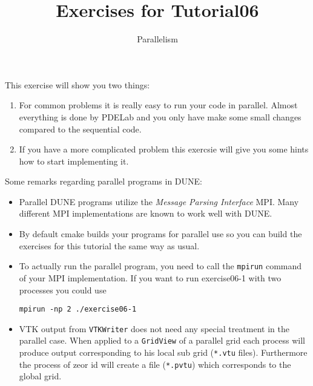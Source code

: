 \documentclass[12pt,a4paper]{article}
\title{\textbf{Exercises for Tutorial06}}
\subtitle{Parallelism}
\begin{document}
\exerciseheader

This exercise will show you two things:
\begin{enumerate}
\item For common problems it is really easy to run your code in
  parallel. Almost everything is done by PDELab and you only have make
  some small changes compared to the sequential code.
\item If you have a more complicated problem this exercsie will give
  you some hints how to start implementing it.
\end{enumerate}

Some remarks regarding parallel programs in DUNE:
\begin{itemize}
\item Parallel DUNE programs utilize the \emph{Message Parsing
    Interface} MPI. Many different MPI implementations are known to
  work well with DUNE.
\item By default cmake builds your programs for parallel use so you
  can build the exercises for this tutorial the same way as usual.
\item To actually run the parallel program, you need to call the
  \lstinline{mpirun} command of your MPI implementation. If you want
  to run exercise06-1 with two processes you could use
  \begin{lstlisting}
mpirun -np 2 ./exercise06-1
  \end{lstlisting}
\item VTK output from \lstinline{VTKWriter} does not need any special
  treatment in the parallel case. When applied to a
  \lstinline{GridView} of a parallel grid each process will produce
  output corresponding to his local sub grid (\lstinline{*.vtu}
  files).  Furthermore the process of zeor id will create a file
  (\lstinline{*.pvtu}) which corresponds to the global grid.
\end{itemize}
\end{document}
